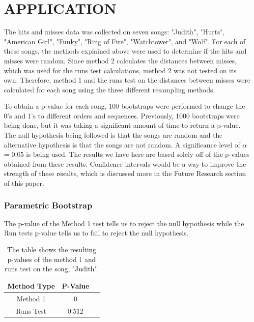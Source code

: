 \documentclass[12pt, letterpaper]{article}
\begin{document}
\section{APPLICATION}
The hits and misses data was collected on seven songs: "Judith", "Hurts", "American Girl", "Funky", "Ring of Fire", "Watchtower", and "Wolf". For each of these songs, the methods explained above were used to determine if the hits and misses were random. Since method 2 calculates the distances between misses, which was used for the runs test calculations, method 2 was not tested on its own. Therefore, method 1 and the runs test on the distances between misses were calculated for each song using the three different resampling methods.

To obtain a p-value for each song, 100 bootstraps were performed to change the 0's and 1's to different orders and sequences.  Previously, 1000 bootstraps were being done, but it was taking a significant amount of time to return a p-value.  The null hypothesis being followed is that the songs are random and the alternative hypothesis is that the songs are not random. A significance level of $\alpha$ = 0.05 is being used. The results we have here are based solely off of the p-values obtained from these results. Confidence intervals would be a way to improve the strength of these results, which is discussed more in the Future Research section of this paper.

\subsubsection{Parametric Bootstrap}
The p-value of the Method 1 test tells us to reject the null hypothesis while the Run tests p-value tells us to fail to reject the null hypothesis.
\begin{table}[h]
\begin{center}
\begin{tabular}{|c|c|c|}
\hline
\textbf{Method Type} & P-Value \\
\hline
Method 1 & 0 \\
\hline
Runs Test & 0.512 \\ 
\hline
\end{tabular} 
\end{center}
\caption{The table shows the resulting p-values of the method 1 and runs test on the song, "Judith".}
\label{fig: P-values for "Judith": Parametric Bootstrap}
\end{table}
\end{document}
